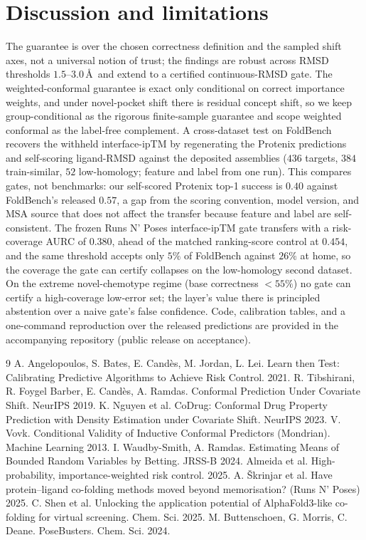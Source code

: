 \documentclass[10pt]{article}
\begin{document}
\section{Discussion and limitations}
The guarantee is over the chosen correctness definition and the sampled shift axes, not a universal
notion of trust; the findings are robust across RMSD thresholds $1.5$--$3.0$\,\AA\ and extend to a
certified continuous-RMSD gate. The weighted-conformal guarantee is exact only conditional on correct
importance weights, and under novel-pocket shift there is residual concept shift, so we keep
group-conditional as the rigorous finite-sample guarantee and scope weighted conformal as the
label-free complement. A cross-dataset test on FoldBench recovers the withheld interface-ipTM by
regenerating the Protenix predictions and self-scoring ligand-RMSD against the deposited assemblies
($436$ targets, $384$ train-similar, $52$ low-homology; feature and label from one run). This compares
gates, not benchmarks: our self-scored Protenix top-1 success is $0.40$ against FoldBench's released
$0.57$, a gap from the scoring convention, model version, and MSA source that does not affect the
transfer because feature and label are self-consistent. The frozen Runs N' Poses interface-ipTM gate
transfers with a risk-coverage AURC of $0.380$, ahead of the matched ranking-score control at $0.454$,
and the same threshold accepts only $5\%$ of FoldBench against $26\%$ at home, so the coverage the gate
can certify collapses on the low-homology second dataset. On the extreme novel-chemotype regime (base
correctness $<55\%$) no gate can certify a high-coverage low-error set; the layer's value there is
principled abstention over a naive gate's false confidence. Code, calibration tables, and a
one-command reproduction over the released predictions are provided in the accompanying repository
(public release on acceptance).

\small

\begin{thebibliography}{9}
 A. Angelopoulos, S. Bates, E. Cand\`es, M. Jordan, L. Lei. Learn then Test: Calibrating Predictive Algorithms to Achieve Risk Control. 2021.
 R. Tibshirani, R. Foygel Barber, E. Cand\`es, A. Ramdas. Conformal Prediction Under Covariate Shift. NeurIPS 2019.
 K. Nguyen et al. CoDrug: Conformal Drug Property Prediction with Density Estimation under Covariate Shift. NeurIPS 2023.
 V. Vovk. Conditional Validity of Inductive Conformal Predictors (Mondrian). Machine Learning 2013.
 I. Waudby-Smith, A. Ramdas. Estimating Means of Bounded Random Variables by Betting. JRSS-B 2024.
 Almeida et al. High-probability, importance-weighted risk control. 2025.
 A. \v{S}krinjar et al. Have protein--ligand co-folding methods moved beyond memorisation? (Runs N' Poses) 2025.
 C. Shen et al. Unlocking the application potential of AlphaFold3-like co-folding for virtual screening. Chem. Sci. 2025.
 M. Buttenschoen, G. Morris, C. Deane. PoseBusters. Chem. Sci. 2024.
\end{thebibliography}
\end{document}
